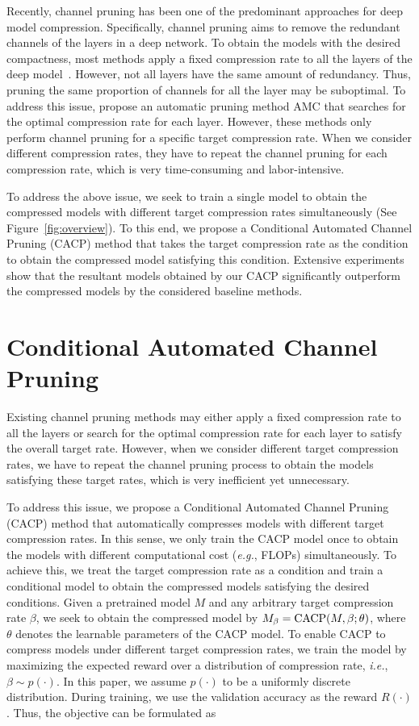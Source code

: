 \documentclass[letterpaper]{article} %
\def\ie{\textit{i.e.}}
\def\eg{\textit{e.g.}}
\begin{document}
Recently, channel pruning has been one of the predominant approaches for deep model compression. Specifically, channel pruning aims to remove the redundant channels of the layers in a deep network.
To obtain the models with the desired compactness, most methods apply a fixed compression rate to all the layers of the deep model~\cite{zhuang2018discrimination,he2019filter}. However, not all layers have the same amount of redundancy. Thus, pruning the same proportion of channels for all the layer may be suboptimal. To address this issue, \citet{he2018amc} propose an automatic pruning method AMC that searches for the optimal compression rate for each layer. However, these methods only perform channel pruning for a specific target compression rate. When we consider different compression rates, they have to repeat the channel pruning for each compression rate, which is very time-consuming and labor-intensive.

To address the above issue, we seek to train a single model to obtain the compressed models with different target compression rates simultaneously (See Figure~\ref{fig:overview}).
To this end, we propose a Conditional Automated Channel Pruning (CACP) method that takes the target compression rate as the condition to obtain the compressed model satisfying this condition. Extensive experiments show that the resultant models obtained by our CACP significantly outperform the compressed models by the considered baseline methods.

\section{Conditional Automated Channel Pruning}

Existing channel pruning methods may either apply a fixed compression rate to all the layers or search for the optimal compression rate for each layer to satisfy the overall target rate. However, when we consider different target compression rates, we have to repeat the channel pruning process to obtain the models satisfying these target rates, which is very inefficient yet unnecessary.

To address this issue, we propose a Conditional Automated Channel Pruning (CACP) method that automatically compresses models with different target compression rates. In this sense, we only train the CACP model once to obtain the models with different computational cost (\eg, FLOPs) simultaneously. To achieve this, we treat the target compression rate as a condition and train a conditional model to obtain the compressed models satisfying the desired conditions.
Given a pretrained model $M$ and any arbitrary target compression rate $\beta$, we seek to obtain the compressed model by 
$M_\beta = {\rm CACP}(M,\beta;\theta)$, where $\theta$ denotes the learnable parameters of the CACP model. 
To enable CACP to compress models under different target compression rates, we train the model by maximizing the expected reward over a distribution of compression rate, \ie, $\beta {\sim} p(\cdot)$. In this paper, we assume $p(\cdot)$ to be a uniformly discrete distribution. During training, we use the validation accuracy as the reward $R(\cdot)$. Thus, the objective can be formulated as
\end{document}
